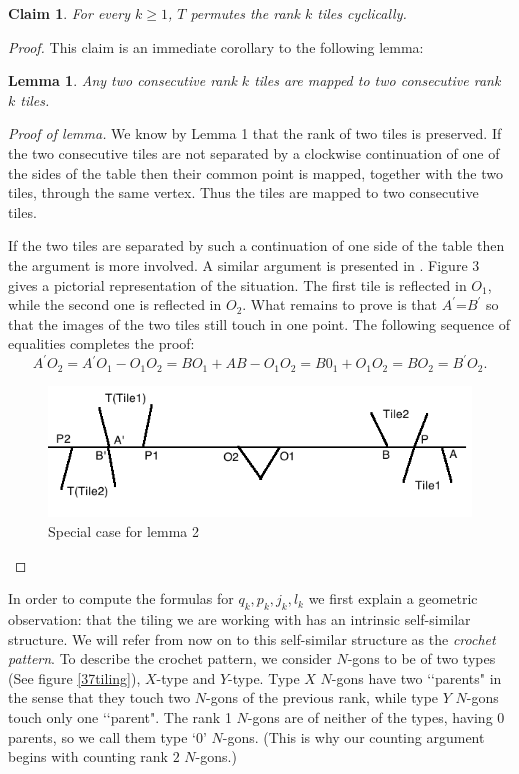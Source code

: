 \documentclass[11pt, oneside]{article}   	%
\newtheorem{lemma}{Lemma}
\newtheorem{claim}{Claim}
\begin{document}
\begin{claim}
For every $k\geq 1$, $T$ permutes the rank $k$ tiles cyclically.
\end{claim}
\begin{proof}
This claim is an immediate corollary to the following lemma:
\begin{lemma}
Any two consecutive rank $k$ tiles are mapped to two consecutive rank $k$ tiles.
\end{lemma}

\textit{Proof of lemma.} We  know by Lemma 1 that the rank of two tiles is preserved. If the two consecutive tiles are not separated by a clockwise continuation of one of the sides of the table then their common point is mapped, together with the two tiles, through the same vertex. Thus the tiles are mapped to two consecutive tiles. 

If the two tiles are separated by such a continuation of one side of the table then  the argument is more involved. A similar argument is presented  in \cite{dogtab}. Figure 3 gives a pictorial representation of the situation. The first tile is reflected in $O_1$, while the second one is reflected in $O_2$. What remains to prove is that $A^{\prime}$=$B^{\prime}$ so that the images of the two tiles still touch in one point. The following sequence of equalities completes the proof:
\[ A^{\prime} O_2=A{^\prime}O_1-O_1O_2=BO_1+AB-O_1O_2=B0_1+O_1O_2=BO_2=B^{\prime}O_2.\]

\begin{figure}
\includegraphics[scale=0.7]{Adjacent.png}
\caption{Special case for lemma 2}
\end{figure}
\end{proof}

In order to  compute the formulas for $q_k,p_k,j_k,l_k$ we first explain a geometric observation: that the tiling we are working with has an intrinsic self-similar structure. We will refer from now on to this self-similar structure as the \textit{crochet pattern}. To describe the crochet pattern, we consider $N$-gons to be of two types (See figure \ref{37tiling}), $X$-type and $Y$-type. Type $X$ $N$-gons have two \lq\lq parents"  in the sense that they touch two $N$-gons of the previous rank, while type $Y$ $N$-gons touch only one  \lq\lq parent". The rank 1 $N$-gons are of neither of the types, having 0 parents, so we call them type \lq 0' $N$-gons. (This is why our counting argument begins with counting rank $2$ $N$-gons.) 
\end{document}
